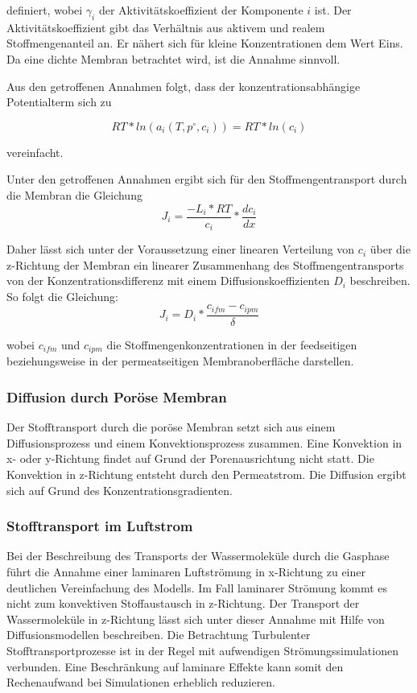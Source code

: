 \begin{normalsize}
\begin{LARGE}
definiert, wobei $\gamma_{i}$ der Aktivitätskoeffizient der Komponente $i$ ist. Der Aktivitätskoeffizient gibt das Verhältnis aus aktivem und realem Stoffmengenanteil an. Er nähert sich für kleine Konzentrationen dem Wert Eins. Da eine dichte Membran betrachtet wird, ist die Annahme sinnvoll.

Aus den getroffenen Annahmen folgt, dass der konzentrationsabhängige Potentialterm sich zu 

\begin{equation}
RT*ln(a_{i}(T,p^\circ,c_{i})) = RT*ln(c_{i})
\end{equation}

vereinfacht.

Unter den getroffenen Annahmen ergibt sich für den Stoffmengentransport durch die Membran die Gleichung
\begin{equation}
J_{i} = \frac{-L_{i}*RT}{c_{i}} * \frac{d c_{i}}{dx}
\end{equation}

Daher lässt sich unter der Voraussetzung einer linearen Verteilung von $c_{i}$ über die z-Richtung der Membran ein linearer Zusammenhang des Stoffmengentransports von der Konzentrationsdifferenz mit einem Diffusionskoeffizienten $D_{i}$ beschreiben. So folgt die Gleichung:
\begin{equation}
J_{i} = D_{i} * \dfrac{c_{ifm}-c_{ipm}}{\delta}
\end{equation}

wobei $c_{ifm}$ und $c_{ipm}$ die Stoffmengenkonzentrationen in der feedseitigen beziehungsweise in der permeatseitigen Membranoberfläche darstellen.


\subsubsection{Diffusion durch Poröse Membran}

Der Stofftransport durch die poröse Membran setzt sich aus einem Diffusionsprozess und einem Konvektionsprozess zusammen. Eine Konvektion in x- oder y-Richtung findet auf Grund der Porenausrichtung nicht statt. Die Konvektion in z-Richtung entsteht durch den Permeatstrom. Die Diffusion ergibt sich auf Grund des Konzentrationsgradienten. 

\subsubsection{Stofftransport im Luftstrom}

Bei der Beschreibung des Transports der Wassermoleküle durch die Gasphase führt die Annahme einer laminaren Luftströmung in x-Richtung zu einer deutlichen Vereinfachung des Modells. Im Fall laminarer Strömung kommt es nicht zum konvektiven Stoffaustausch in z-Richtung. Der Transport der Wassermoleküle in z-Richtung lässt sich unter dieser Annahme mit Hilfe von Diffusionsmodellen beschreiben.
Die Betrachtung Turbulenter Stofftransportprozesse ist in der Regel mit aufwendigen Strömungssimulationen verbunden. Eine Beschränkung auf laminare Effekte kann somit den Rechenaufwand bei Simulationen erheblich reduzieren. 


\end{LARGE}
\end{normalsize}
